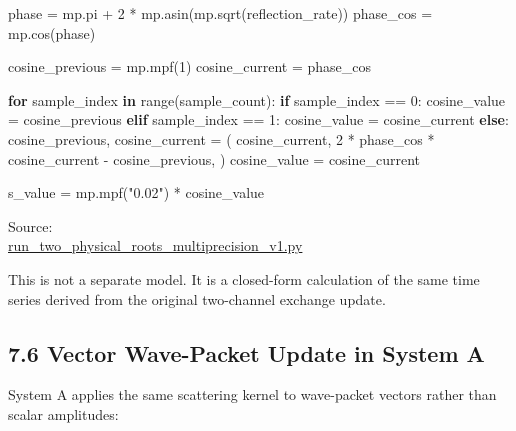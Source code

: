\documentclass[
  10pt,
  a4paper,
]{article}
\newenvironment{Shaded}{}{}
\newcommand{\BuiltInTok}[1]{\textcolor[rgb]{0.00,0.50,0.00}{#1}}
\newcommand{\ControlFlowTok}[1]{\textcolor[rgb]{0.00,0.44,0.13}{\textbf{#1}}}
\newcommand{\DecValTok}[1]{\textcolor[rgb]{0.25,0.63,0.44}{#1}}
\newcommand{\KeywordTok}[1]{\textcolor[rgb]{0.00,0.44,0.13}{\textbf{#1}}}
\newcommand{\NormalTok}[1]{#1}
\newcommand{\OperatorTok}[1]{\textcolor[rgb]{0.40,0.40,0.40}{#1}}
\newcommand{\StringTok}[1]{\textcolor[rgb]{0.25,0.44,0.63}{#1}}
\begin{document}
\begin{Shaded}
\begin{Highlighting}[]
\NormalTok{phase }\OperatorTok{=}\NormalTok{ mp.pi }\OperatorTok{+} \DecValTok{2} \OperatorTok{*}\NormalTok{ mp.asin(mp.sqrt(reflection\_rate))}
\NormalTok{phase\_cos }\OperatorTok{=}\NormalTok{ mp.cos(phase)}

\NormalTok{cosine\_previous }\OperatorTok{=}\NormalTok{ mp.mpf(}\DecValTok{1}\NormalTok{)}
\NormalTok{cosine\_current }\OperatorTok{=}\NormalTok{ phase\_cos}

\ControlFlowTok{for}\NormalTok{ sample\_index }\KeywordTok{in} \BuiltInTok{range}\NormalTok{(sample\_count):}
    \ControlFlowTok{if}\NormalTok{ sample\_index }\OperatorTok{==} \DecValTok{0}\NormalTok{:}
\NormalTok{        cosine\_value }\OperatorTok{=}\NormalTok{ cosine\_previous}
    \ControlFlowTok{elif}\NormalTok{ sample\_index }\OperatorTok{==} \DecValTok{1}\NormalTok{:}
\NormalTok{        cosine\_value }\OperatorTok{=}\NormalTok{ cosine\_current}
    \ControlFlowTok{else}\NormalTok{:}
\NormalTok{        cosine\_previous, cosine\_current }\OperatorTok{=}\NormalTok{ (}
\NormalTok{            cosine\_current,}
            \DecValTok{2} \OperatorTok{*}\NormalTok{ phase\_cos }\OperatorTok{*}\NormalTok{ cosine\_current }\OperatorTok{{-}}\NormalTok{ cosine\_previous,}
\NormalTok{        )}
\NormalTok{        cosine\_value }\OperatorTok{=}\NormalTok{ cosine\_current}

\NormalTok{    s\_value }\OperatorTok{=}\NormalTok{ mp.mpf(}\StringTok{"0.02"}\NormalTok{) }\OperatorTok{*}\NormalTok{ cosine\_value}
\end{Highlighting}
\end{Shaded}

Source:\\
\href{run_two_physical_roots_multiprecision_v1.py\#L64-L106}{run\_two\_physical\_roots\_multiprecision\_v1.py}

This is not a separate model. It is a closed-form calculation of the
same time series derived from the original two-channel exchange update.

\subsection{7.6 Vector Wave-Packet Update in System
A}\label{vector-wave-packet-update-in-system-a}

System A applies the same scattering kernel to wave-packet vectors
rather than scalar amplitudes:
\end{document}
